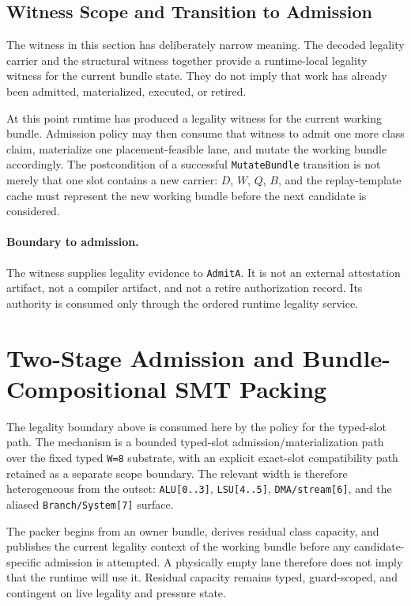 \documentclass[twocolumn]{article}
\begin{document}
\subsection{Witness Scope and Transition to Admission}

The witness in this section has deliberately narrow meaning. The decoded legality carrier and the structural witness together provide a runtime-local legality witness for the current bundle state. They do not imply that work has already been admitted, materialized, executed, or retired.

At this point runtime has produced a legality witness for the current working bundle. Admission policy may then consume that witness to admit one more class claim, materialize one placement-feasible lane, and mutate the working bundle accordingly. The postcondition of a successful \texttt{MutateBundle} transition is not merely that one slot contains a new carrier: \(D\), \(W\), \(Q\), \(B\), and the replay-template cache must represent the new working bundle before the next candidate is considered.

\paragraph{Boundary to admission.}
The witness supplies legality evidence to \texttt{AdmitA}. It is not an external attestation artifact, not a compiler artifact, and not a retire authorization record. Its authority is consumed only through the ordered runtime legality service.


\section{Two-Stage Admission and Bundle-Compositional SMT Packing}

The legality boundary above is consumed here by the policy for the typed-slot path. The mechanism is a bounded typed-slot admission/materialization path over the fixed typed \texttt{W=8} substrate, with an explicit exact-slot compatibility path retained as a separate scope boundary. The relevant width is therefore heterogeneous from the outset: \texttt{ALU[0..3]}, \texttt{LSU[4..5]}, \texttt{DMA/stream[6]}, and the aliased \texttt{Branch/System[7]} surface.

The packer begins from an owner bundle, derives residual class capacity, and publishes the current legality context of the working bundle before any candidate-specific admission is attempted. A physically empty lane therefore does not imply that the runtime will use it. Residual capacity remains typed, guard-scoped, and contingent on live legality and pressure state.
\end{document}
